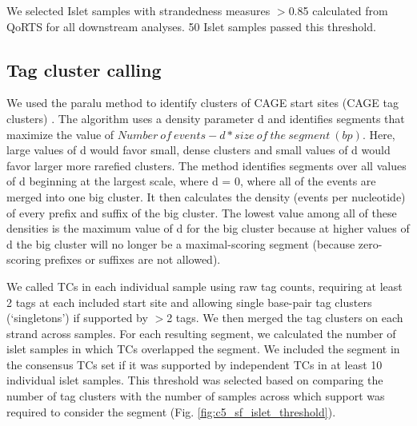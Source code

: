 We selected Islet samples with strandedness measures $>$0.85 calculated from QoRTS \cite{hartleyQoRTsComprehensiveToolset2015a} for all downstream analyses. 50 Islet samples passed this threshold.


\subsection{Tag cluster calling} 
We used the paralu method to identify clusters of CAGE start sites (CAGE tag clusters) \cite{frithCodeTranscriptionInitiation2008}. The algorithm uses a density parameter d and identifies segments that maximize the value of \( Number\:of\:events - d * size\:of\:the\:segment\:(bp) \). Here, large values of d would favor small, dense clusters and small values of d would favor larger more rarefied clusters. The method identifies segments over all values of d beginning at the largest scale, where d = 0, where all of the events are merged into one big cluster. It then calculates the density (events per nucleotide) of every prefix and suffix of the big cluster. The lowest value among all of these densities is the maximum value of d for the big cluster because at higher values of d the big cluster will no longer be a maximal-scoring segment (because zero-scoring prefixes or suffixes are not allowed). 


We called TCs in each individual sample using raw tag counts, requiring at least 2 tags at each included start site and allowing single base-pair tag clusters (‘singletons’) if supported by $>$2 tags. We then merged the tag clusters on each strand across samples. For each resulting segment, we calculated the number of islet samples in which TCs overlapped the segment. We included the segment in the consensus TCs set if it was supported by independent TCs in at least 10 individual islet samples. This threshold was selected based on comparing the number of tag clusters with the number of samples across which support was required to consider the segment (Fig. \ref{fig:c5_sf_islet_threshold}). 
  
